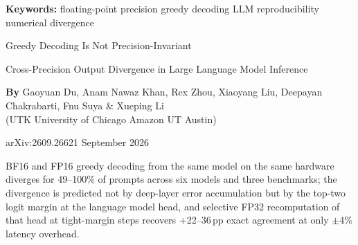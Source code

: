 \documentclass[10pt,twocolumn]{article}
\begin{document}
\setlength{\parindent}{0pt}
\setlength{\parskip}{4pt}

{\small\color{keywordgray}\textbf{Keywords:}
  floating-point precision \textbullet{}
  greedy decoding \textbullet{}
  LLM reproducibility \textbullet{}
  numerical divergence}\par\vspace{4pt}

{\LARGE\bfseries\raggedright
  Greedy Decoding Is Not Precision-Invariant}\par\vspace{4pt}

{\large\itshape\raggedright
  Cross-Precision Output Divergence in Large Language Model Inference}\par\vspace{6pt}

{\small\textbf{By} Gaoyuan Du, Anam Nawaz Khan, Rex Zhou, Xiaoyang Liu,
  Deepayan Chakrabarti, Fnu Suya \& Xueping Li\\
  (UTK \textbullet{} University of Chicago \textbullet{} Amazon \textbullet{} UT Austin)}\par\vspace{2pt}

{\small\color{keywordgray}arXiv:2609.26621 \textbullet{} September 2026}
\par\vspace{2pt}\noindent{\color{rulered}\rule{\columnwidth}{0.6pt}}\vspace{6pt}

BF16 and FP16 greedy decoding from the same model on the same hardware
diverges for 49--100\% of prompts across six models and three benchmarks;
the divergence is predicted not by deep-layer error accumulation but by
the top-two logit margin at the language model head, and selective
FP32 recomputation of that head at tight-margin steps recovers
+22--36\,pp exact agreement at only $\pm$4\% latency overhead.
\end{document}

